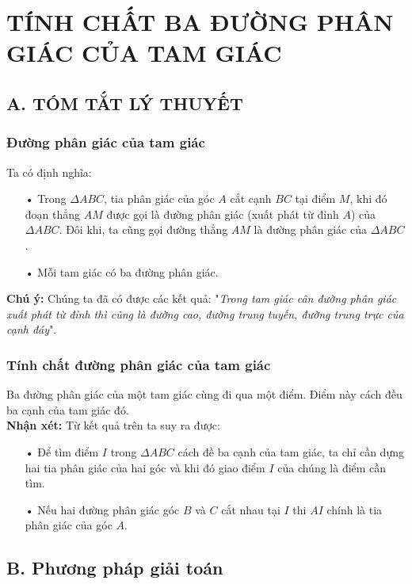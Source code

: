 \section{TÍNH CHẤT BA ĐƯỜNG PHÂN GIÁC CỦA TAM GIÁC}
\subsection*{A. TÓM TẮT LÝ THUYẾT}
\subsubsection{Đường phân giác của tam giác}
Ta có định nghĩa: 
\begin{enumerate}
\item[•] Trong $\Delta ABC$, tia phân giác của góc $A$ cắt cạnh $BC$ tại điểm $M$, khi đó đoạn thẳng $AM$ được gọi là đường phân giác (xuất phát từ đỉnh $A$) của $\Delta ABC$. Đôi khi, ta cũng gọi đường thẳng $AM$ là đường phân giác của $\Delta ABC$. 
\item[•] Mỗi tam giác có ba đường phân giác.
\end{enumerate}
\textbf{Chú ý:} Chúng ta đã có được các kết quả: "\emph{Trong tam giác cân đường phân giác xuất phát từ đỉnh thì cũng là đường cao, đường trung tuyến, đường trung trực của cạnh đáy}". 
\subsubsection{Tính chất đường phân giác của tam giác}
Ba đường phân giác của một tam giác cùng đi qua một điểm. Điểm này cách đều ba cạnh của tam giác đó. \\
\textbf{Nhận xét:} Từ kết quả trên ta suy ra được: 
\begin{enumerate}
\item[•] Để tìm điểm $I$ trong $\Delta ABC$ cách đề ba cạnh của tam giác, ta chỉ cần dựng hai tia phân giác của hai góc và khi đó giao điểm $I$ của chúng là điểm cần tìm.
\item[•] Nếu hai đường phân giác góc $B$ và $C$ cắt nhau tại $I$ thi $AI$ chính là tia phân giác của góc $A$.
\end{enumerate}
\subsection*{B. Phương pháp giải toán}
\setcounter{vd}{0}
